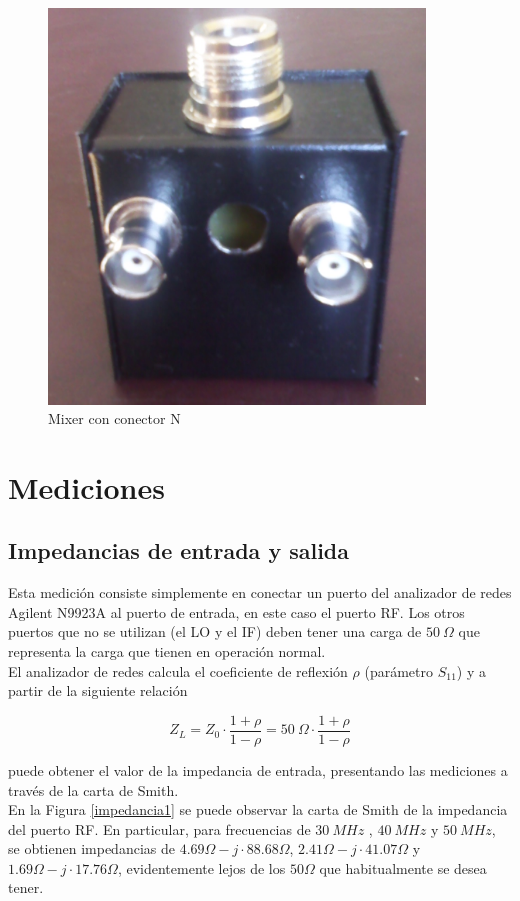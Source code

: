 \documentclass[a4paper,10pt]{article}
\begin{document}
	\begin{figure}[!htb]
		\centering
		\includegraphics[width=10cm]{Images/modifiedMixer.png}
		\caption{Mixer con conector N}
		\label{mixerNuevo}
	\end{figure}

	\section{Mediciones}
	\subsection{Impedancias de entrada y salida}
	\indent Esta medici\'on consiste simplemente en conectar un puerto del 
	analizador de redes Agilent N9923A al puerto de entrada, en este caso el 
	puerto RF. Los otros puertos que no se utilizan (el LO y el IF) deben tener 
	una carga de $50~\Omega$ que representa la carga que tienen en operaci\'on 
	normal. \\
	\indent El analizador de redes calcula el coeficiente de reflexi\'on $\rho$ 
	(par\'ametro $S_{11}$) y a partir de la siguiente relaci\'on
	
	$$Z_L =Z_0\cdot\frac{1+\rho}{1-\rho}=50~\Omega\cdot\frac{1+\rho}{1-\rho}$$
	
	puede obtener el valor de la impedancia de entrada, presentando las 
	mediciones a trav\'es de la carta de Smith. \\
	\indent En la Figura \ref{impedancia1} se puede observar la carta de Smith 
	de la impedancia del puerto RF. En particular, para  frecuencias de $30~MHz$
	, $40~MHz$ y $50~MHz$, se obtienen impedancias de 
	$4.69\Omega-j\cdot88.68\Omega$, $2.41\Omega-j\cdot41.07\Omega$ y 
	$1.69\Omega-j\cdot17.76\Omega$, evidentemente lejos de los $50\Omega$ que 
	habitualmente se desea tener.	
	
\end{document}
